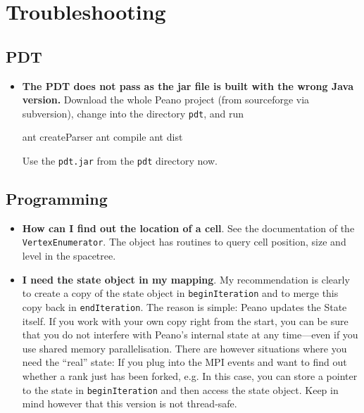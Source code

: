 \chapter{Troubleshooting}

\section{PDT}

\begin{itemize}
  \item {\bf The PDT does not pass as the jar file is built with the wrong Java
  version.} Download the whole Peano project (from sourceforge via subversion),
  change into the directory \texttt{pdt}, and run
  \begin{code}
  ant createParser
  ant compile
  ant dist
  \end{code}
  Use the \texttt{pdt.jar} from the \texttt{pdt} directory now. 
\end{itemize}



\section{Programming}

\begin{itemize}
  \item {\bf How can I find out the location of a cell}. See the documentation
  of the \texttt{VertexEnumerator}. The object has routines to query cell
  position, size and level in the spacetree.
  \item {\bf I need the state object in my mapping}. My recommendation is
  clearly to create a copy of the state object in \texttt{beginIteration} and to
  merge this copy back in \texttt{endIteration}. The reason is simple: Peano
  updates the State itself. If you work with your own copy right from the start,
  you can be sure that you do not interfere with Peano's internal state at any
  time---even if you use shared memory parallelisation. There are however
  situations where you need the ``real'' state: If you plug into the MPI events
  and want to find out whether a rank just has been forked, e.g. In this case,
  you can store a pointer to the state in \texttt{beginIteration} and then
  access the state object. Keep in mind however that this version is not
  thread-safe.
\end{itemize}
